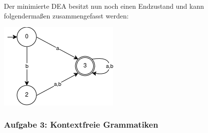 \begin{teile}
	Der minimierte DEA besitzt nun noch einen Endzustand und kann folgendermaßen zusammengefasst werden:
	
	\includegraphics[scale=0.75]{MiniDEA3} 

\end{teile}

\newpage
\subsubsection{Aufgabe 3: Kontextfreie Grammatiken}

